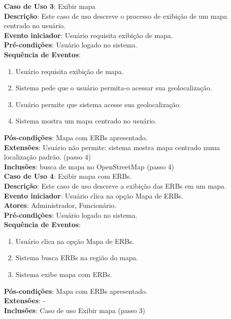 \documentclass[]{politex}
\begin{document}
\noindent \textbf{Caso de Uso 3}: Exibir mapa \\
\textbf{Descrição}: Este caso de uso descreve o processo de exibição de um mapa centrado no usuário. \\
\textbf{Evento iniciador}: Usuário requisita exibição de mapa. \\
\textbf{Pré-condições}: Usuário logado no sistema. \\
\textbf{Sequência de Eventos}:
\begin{enumerate}
\item Usuário requisita exibição de mapa.
\item Sistema pede que o usuário permita-o acessar sua geolocalização.
\item Usuário permite que sistema acesse sua geolocalização.
\item Sistema mostra um mapa centrado no usuário.
\end{enumerate}
\textbf{Pós-condições}: Mapa com ERBs apresentado. \\
\textbf{Extensões}: Usuário não permite: sistema mostra mapa centrado numa localização padrão. (passo 4) \\
\textbf{Inclusões}: busca de mapa no OpenStreetMap (passo 4) \\

\noindent \textbf{Caso de Uso 4}: Exibir mapa com ERBs. \\
\textbf{Descrição}: Este caso de uso descreve a exibição das ERBs em um mapa. \\
\textbf{Evento iniciador}: Usuário clica na opção Mapa de ERBs. \\
\textbf{Atores}: Administrador, Funcionário. \\
\textbf{Pré-condições}: Usuário logado no sistema. \\
\textbf{Sequência de Eventos}:
\begin{enumerate}
\item Usuário clica na opção Mapa de ERBs.
\item Sistema busca ERBs na região do mapa.
\item Sistema exibe mapa com ERBs.
\end{enumerate}
\textbf{Pós-condições}: Mapa com ERBs apresentado. \\
\textbf{Extensões}: - \\
\textbf{Inclusões}: Caso de uso Exibir mapa (passo 3) \\
\end{document}
